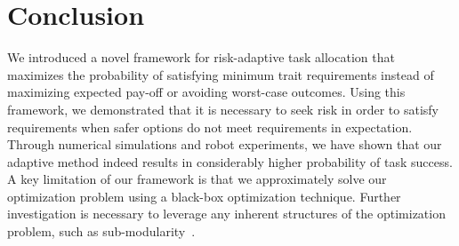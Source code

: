 \documentclass[letterpaper, 10 pt, conference]{ieeeconf}  %
\begin{document}
\section{Conclusion}

We introduced a novel framework for risk-adaptive task allocation that maximizes the probability of satisfying minimum trait requirements instead of maximizing expected pay-off or avoiding worst-case outcomes. Using this framework, we demonstrated that it is necessary to seek risk in order to satisfy requirements when safer options do not meet requirements in expectation. Through numerical simulations and robot experiments, we have shown that our adaptive method indeed results in considerably higher probability of task success. A key limitation of our framework is that we approximately solve our optimization problem using a black-box optimization technique. Further investigation is necessary to leverage any inherent structures of the optimization problem, such as sub-modularity~\cite{prorok_redundant_2019,zhou2020}. 

\addtolength{\textheight}{-12cm}   %

















\end{document}
